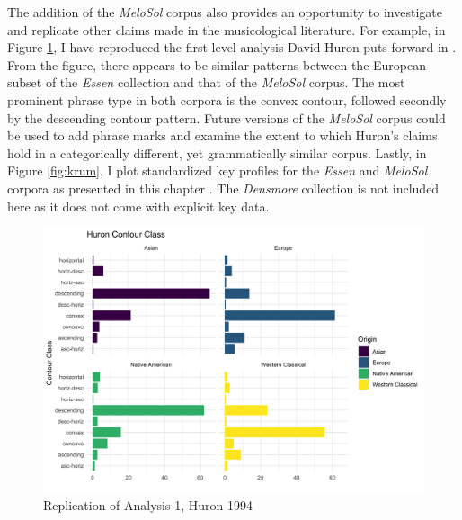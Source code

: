 \documentclass[12pt,]{book}
\begin{document}
The addition of the \emph{MeloSol} corpus also provides an opportunity to investigate and replicate other claims made in the musicological literature.
For example, in Figure \ref{fig:comphuron}, I have reproduced the first level analysis David Huron puts forward in \citep{huronMelodicArchWestern1996}.
From the figure, there appears to be similar patterns between the European subset of the \emph{Essen} collection and that of the \emph{MeloSol} corpus.
The most prominent phrase type in both corpora is the convex contour, followed secondly by the descending contour pattern.
Future versions of the \emph{MeloSol} corpus could be used to add phrase marks and examine the extent to which Huron's claims hold in a categorically different, yet grammatically similar corpus.
Lastly, in Figure \ref{fig:krum}, I plot standardized key profiles for the \emph{Essen} and \emph{MeloSol} corpora as presented in this chapter \citep{krumhanslCognitiveFoundationsMusical2001}.
The \emph{Densmore} collection is not included here as it does not come with explicit key data.

\begin{figure}

{\centering \includegraphics[width=1\linewidth]{img/huronrecreation} 

}

\caption{Replication of Analysis 1, Huron 1994}\label{fig:comphuron}
\end{figure}
\end{document}
